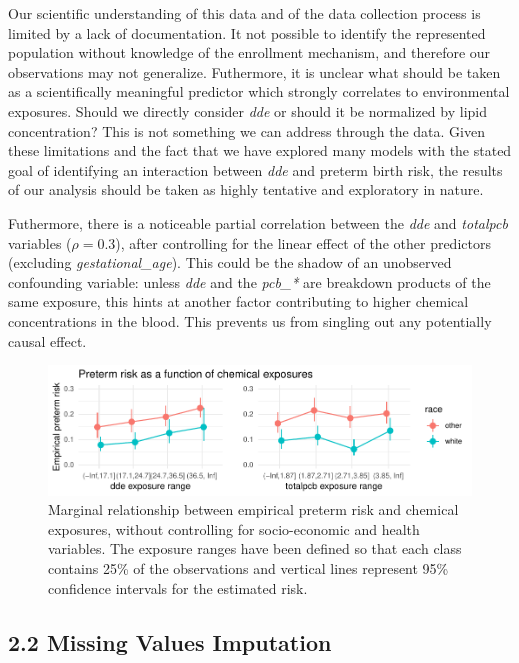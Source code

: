 \documentclass[10pt,]{article}
\begin{document}
Our scientific understanding of this data and of the data collection
process is limited by a lack of documentation. It not possible to
identify the represented population without knowledge of the enrollment
mechanism, and therefore our observations may not generalize.
Futhermore, it is unclear what should be taken as a scientifically
meaningful predictor which strongly correlates to environmental
exposures. Should we directly consider \emph{dde} or should it be
normalized by lipid concentration? This is not something we can address
through the data. Given these limitations and the fact that we have
explored many models with the stated goal of identifying an interaction
between \emph{dde} and preterm birth risk, the results of our analysis
should be taken as highly tentative and exploratory in nature.

Futhermore, there is a noticeable partial correlation between the
\emph{dde} and \emph{totalpcb} variables (\(\rho = 0.3\)), after
controlling for the linear effect of the other predictors (excluding
\emph{gestational\_age}). This could be the shadow of an unobserved
confounding variable: unless \emph{dde} and the \emph{pcb\_*} are
breakdown products of the same exposure, this hints at another factor
contributing to higher chemical concentrations in the blood. This
prevents us from singling out any potentially causal effect.

\begin{figure}
\centering
\includegraphics{report_files/figure-latex/marginal effect plot-1.pdf}
\caption{Marginal relationship between empirical preterm risk and
chemical exposures, without controlling for socio-economic and health
variables. The exposure ranges have been defined so that each class
contains 25\% of the observations and vertical lines represent 95\%
confidence intervals for the estimated risk.}
\end{figure}

\hypertarget{missing-values-imputation}{%
\subsection{2.2 Missing Values
Imputation}\label{missing-values-imputation}}
\end{document}
